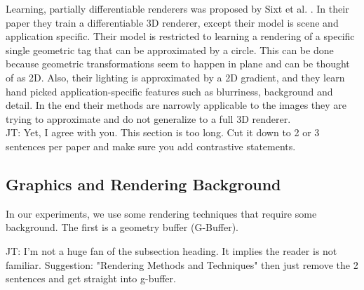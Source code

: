 \documentclass[10pt,twocolumn,letterpaper]{article}
\newcommand{\tompson}[1]{{\color{green} JT: #1}}
\begin{document}
Learning, partially differentiable renderers was proposed by Sixt et al. \cite{DBLP:journals/corr/SixtWL17}. In their paper they train a differentiable 3D renderer, except their model is scene and application specific. Their model is restricted to learning a rendering of a specific single geometric tag that can be approximated by a circle. This can be done because geometric transformations seem to happen in plane and can be thought of as 2D.  Also, their lighting is approximated by a 2D gradient, and they learn hand picked application-specific features such as blurriness, background and detail.  In the end their methods are narrowly applicable to the images they are trying to approximate and do not generalize to a full 3D renderer. \\



\tompson{Yet, I agree with you. This section is too long. Cut it down to 2 or 3 sentences per paper and make sure you add contrastive statements.}

\subsection{Graphics and Rendering Background}

In our experiments, we use some rendering techniques that require some background.  The first is a geometry buffer (G-Buffer).

\tompson{I'm not a huge fan of the subsection heading. It implies the reader is not familiar. Suggestion: "Rendering Methods and Techniques" then just remove the 2 sentences and get straight into g-buffer.}

\end{document}
